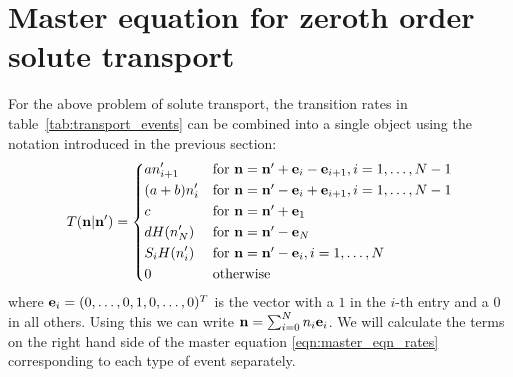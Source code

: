 \section{Master equation for zeroth order solute transport}
For the above problem of solute transport, the transition rates in
table~\ref{tab:transport_events} can be combined into a single object using the
notation introduced in the previous section:
\begin{equation}
    \label{eqn:transition_rates_zeroth_order}
    T(\V{n}|\V{n}') =%
        \begin{dcases*}
            a n'_{i+1} & for \(\V{n} = \V{n}' + \V{e}_i - \V{e}_{i+1},
            i=1,\dotsc,N-1\)\\
            (a+b) n'_i & for \(\V{n} = \V{n}' - \V{e}_i + \V{e}_{i+1},
            i=1,\dotsc,N-1\)\\
            c & for \(\V{n} = \V{n}' + \V{e}_1\)\\
            d H(n'_N) & for \(\V{n} = \V{n}' - \V{e}_N\)\\
            S_i H(n'_i) & for \(\V{n} = \V{n}' - \V{e}_i, i=1,\dotsc,N\)\\
            0 & otherwise
        \end{dcases*}
\end{equation}
where \(\mathbf{e}_i = (0,\dotsc,0,1,0,\dotsc,0)^T\) is the vector with a \(1\) in
the \(i\)-th entry and a \(0\) in all others. Using this we can write \(\mathbf{n} =
\sum_{i=0}^{N} n_i \mathbf{e}_i\). We will calculate the terms on the right hand side
of the master equation \eqref{eqn:master_eqn_rates} corresponding to each type
of event separately.

